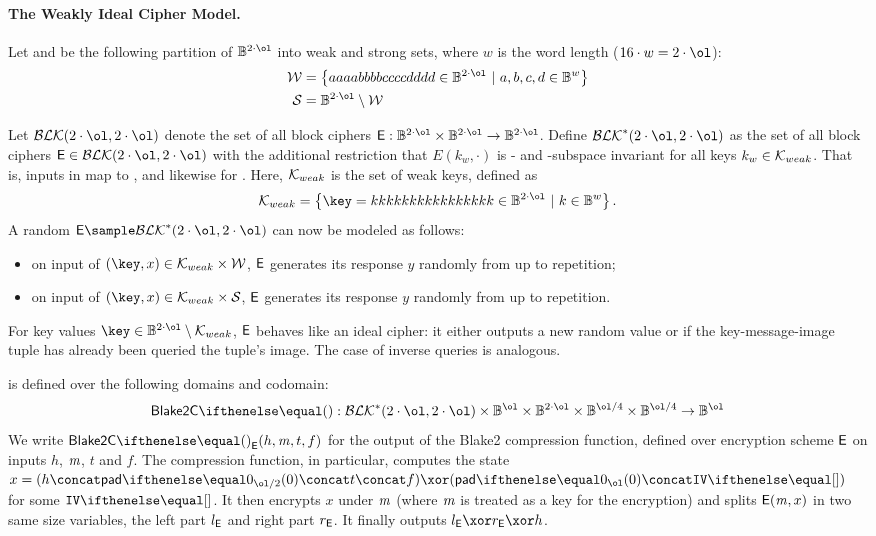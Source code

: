 \paragraph{The Weakly Ideal Cipher Model.}

Let \weakSet and \strongSet be the following partition of $\BB^{2 \cdot \ol}$ into weak and strong sets, where $w$ is the word length ($16 \cdot w = 2 \cdot \ol$):
\begin{align*}
    \weakSet &= \smallset{aaaabbbbccccdddd \in \BB^{2 \cdot \ol}\ |\ a, b, c, d \in \BB^w} \\
    \strongSet &= \BB^{2 \cdot \ol} \setminus \weakSet
\end{align*}

Let $\blockSet(2 \cdot \ol, 2 \cdot \ol)$ denote the set of all block ciphers $\Enc{}: \BB^{2 \cdot \ol}\times \BB^{2 \cdot \ol} \rightarrow \BB^{2 \cdot \ol}$. Define $\blockSet^{*}(2 \cdot \ol, 2 \cdot \ol)$ as the set of all block ciphers $\Enc \in \blockSet(2 \cdot \ol, 2 \cdot \ol)$ with the additional restriction that $E(k_w,\cdot)$ is \weakSet- and \strongSet-subspace invariant for all keys $k_w \in \mathcal{K}_{weak}$. That is, inputs in \weakSet map to \weakSet, and likewise for \strongSet. Here, $\mathcal{K}_{weak}$ is the set of weak keys, defined as
\[
    \keyspace_{weak} = \smallset{ \key = kkkkkkkkkkkkkkkk \in \BB^{2 \cdot \ol}\ |\ k \in \BB^w }.
\]
A random $ \Enc \sample \blockSet^{*}(2 \cdot \ol, 2 \cdot \ol)$ can now be modeled as follows:
\begin{itemize}
    \item on input of $(\key, x) \in \keyspace_{weak} \times \weakSet$, $\mathsf{E}$ generates its response $y$ randomly from \weakSet up to repetition;
    \item on input of $(\key, x) \in \keyspace_{weak} \times \strongSet$, $\mathsf{E}$ generates its response $y$ randomly from \strongSet up to repetition.
\end{itemize}

For key values $\key \in \BB^{2 \cdot \ol} \setminus \keyspace_{weak}$, $\mathsf{E}$ behaves like an ideal cipher: it either outputs a new random value or if the key-message-image tuple has already been queried the tuple's image. The case of inverse queries is analogous.


 is defined over the following domains and codomain:
\[
    \blake{2C}{}: \blockSet^{*}(2 \cdot \ol, 2 \cdot \ol) \times \BB^{\ol} \times \BB^{2 \cdot \ol} \times \BB^{\ol/4} \times \BB^{\ol/4} \to \BB^{\ol}
\]
We write $\blake{2C}{}_\Enc(h, \msg, t, f)$ for the output of the Blake2 compression function, defined over encryption scheme $\mathsf{E}$ on inputs $h$, $\mathit{m}$, $t$ and $f$. The compression function, in particular, computes the state $x = (h \concat \pad{0}{\ol/2} \concat t \concat f) \xor (\pad{0}{\ol} \concat \blakeIV{})$ for some $\blakeIV{}$. It then encrypts $x$ under $\mathit{m}$ (where $\mathit{m}$ is treated as a key for the encryption) and splits $\mathsf{E}(\mathit{m}, x)$ in two same size variables, the left part $l_{\mathsf{E}}$ and right part $r_{\mathsf{E}}$. It finally outputs $l_\Enc \xor r_\Enc \xor h$.\linebreak

